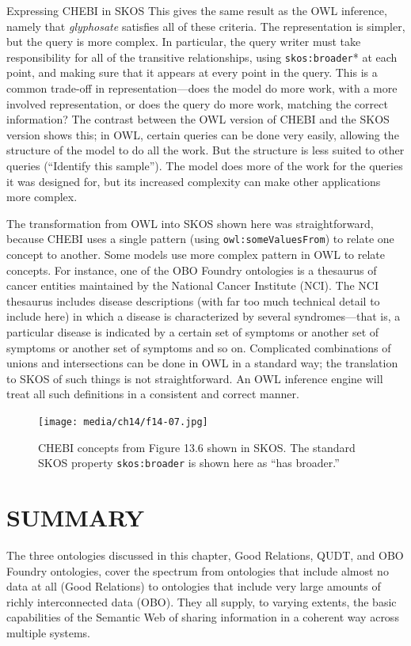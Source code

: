 \begin{challenge}{Expressing CHEBI in SKOS}
This gives the same result as the OWL inference, namely that \textit{glyphosate}
satisfies all of these criteria. The representation is simpler, but the
query is more complex. In particular, the query writer must take
responsibility for all of the transitive relationships, using
\texttt{skos:broader}* at each point, and making sure that it appears at every
point in the query. This is a common trade-off in representation---does
the model do more work, with a more involved representation, or does the
query do more work, matching the correct information? The contrast
between the OWL version of CHEBI and the SKOS version shows this; in
OWL, certain queries can be done very easily, allowing the structure of
the model to do all the work. But the structure is less suited to other
queries (``Identify this sample''). The model does more of the work for
the queries it was designed for, but its increased complexity can make
other applications more complex.

The transformation from OWL into SKOS shown here was straightforward,
because CHEBI uses a single pattern (using \texttt{owl:someValuesFrom}) to relate
one concept to another. Some models use more complex pattern in OWL to
relate concepts. For instance, one of the OBO Foundry ontologies is a
thesaurus of cancer entities maintained by the National Cancer Institute
(NCI). The NCI thesaurus includes disease descriptions (with far too
much technical detail to include here) in which a disease is
characterized by several syndromes---that is, a particular disease is
indicated by a certain set of symptoms or another set of symptoms or
another set of symptoms and so on. Complicated combinations of unions
and intersections can be done in OWL in a standard way; the translation
to SKOS of such things is not straightforward. An OWL inference engine
will treat all such definitions in a consistent and correct manner.



\begin{figure}
\centering
\texttt{[image: media/ch14/f14-07.jpg]}
\caption{CHEBI concepts from Figure 13.6 shown in SKOS. The standard SKOS
property \texttt{skos:broader} is shown here as ``has broader.''
}
\label{fig:ch14.07}
\end{figure}


\section{SUMMARY}

The three ontologies discussed in this chapter, Good Relations, QUDT,
and OBO Foundry ontologies, cover the spectrum from ontologies that
include almost no data at all (Good Relations) to ontologies that
include very large amounts of richly interconnected data (OBO). They all
supply, to varying extents, the basic capabilities of the Semantic Web
of sharing information in a coherent way across multiple systems.


\end{challenge}
